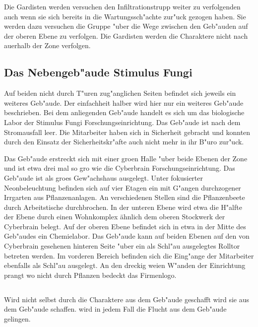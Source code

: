 Die Gardisten werden versuchen den Infiltrationstrupp weiter zu verfolgenden auch wenn sie sich bereits in die Wartungssch"achte zur"uck gezogen haben. Sie werden dazu versuchen die Gruppe "uber die Wege zwischen den Geb"auden auf der oberen Ebene zu verfolgen. Die Gardisten werden die Charaktere nicht nach au\3erhalb der Zone verfolgen.

\subsection{Das Nebengeb"aude Stimulus Fungi} 
Auf beiden nicht durch T"uren zug"anglichen Seiten befindet sich jeweils ein weiteres Geb"aude. Der einfachheit halber wird hier nur ein weiteres Geb"aude beschrieben. Bei dem anliegenden Geb"aude handelt es sich um das biologische Labor der Stimulus Fungi Forschungseinrichtung. Das Geb"aude ist nach dem Stromausfall leer. Die Mitarbeiter haben sich in Sicherheit gebracht und konnten durch den Einsatz der Sicherheitskr"afte auch nicht mehr in ihr B"uro zur"uck. 

Das Geb"aude erstreckt sich mit einer gro\3en Halle "uber beide Ebenen der Zone und ist etwa drei mal so gro\3 wie die Cyberbrain Forschungseinrichtung. Das Geb"aude ist als gro\3es Gew"achshaus ausgelegt. Unter fokusierter Neonbeleuchtung befinden sich auf vier Etagen ein mit G"angen durchzogener Irrgarten aus Pflanzenanlagen. An verschiedenen Stellen sind die Pflanzenbeete durch Arbeitstische durchbrochen. In der unteren Ebene wird etwa die H"alfte der Ebene durch einen Wohnkomplex ähnlich dem oberen Stockwerk der Cyberbrain belegt. Auf der oberen Ebene befindet sich in etwa in der Mitte des Geb"audes ein Chemielabor. Das Geb"aude kann auf beiden Ebenen auf den von Cyberbrain gesehenen hinteren Seite "uber ein als Schl"au\3 ausgelegtes Rolltor betreten werden. Im vorderen Bereich befinden sich die Eing"ange der Mitarbeiter ebenfalls als Schl"au\3 ausgelegt. An den dreckig wei\3en W"anden der Einrichtung prangt wo nicht durch Pflanzen bedeckt das Firmenlogo.

\subsection{\ml{}} 
Wird \ml{} nicht selbst durch die Charaktere aus dem Geb"aude geschafft wird \xl{} sie aus dem Geb"aude schaffen. \ml{} wird in jedem Fall die Flucht aus dem Geb"aude gelingen.

